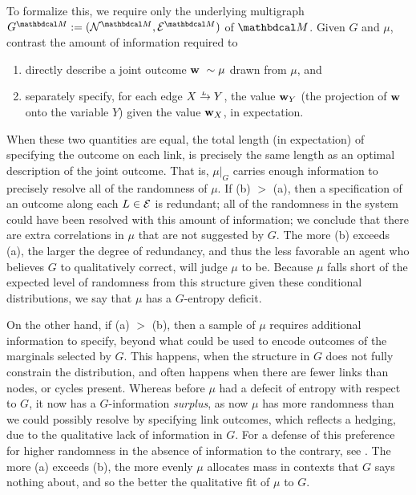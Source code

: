 \documentclass{article}
\begin{document}
	To formalize this, we require only the underlying multigraph $G^{\dg M} :=
	(\N^{\dg M}, \Ed^{\dg M})$ of $\dg M$. 
	Given $G$ and $\mu$, contrast the amount of
	information required to 
	\begin{enumerate}[label=(\alph*)]
		\item directly describe a joint outcome  $\mathbf w ~ \sim \mu$
		drawn from $\mu$, and 
		\item separately specify, for each edge $\ed LXY$, the value
		$\mathbf w_Y$ (the projection of $\mathbf w$ onto the variable
		$Y$) given the value $\mathbf w_X$, in expectation. 
	\end{enumerate}
	When these two quantities are equal, the total length (in expectation) of specifying the outcome on each link, is precisely the same length as an optimal description of the joint outcome. That is, $\mu|_G$ carries enough information to precisely resolve all of the randomness of $\mu$. If (b) $>$ (a), then a specification of an outcome along each $L \in \mathcal E$ is redundant; all of the randomness in the system could have been resolved with this amount of information; we conclude that there are extra correlations in $\mu$ that are not suggested by $G$. The more (b) exceeds (a), the larger the degree of redundancy, and thus the less favorable an agent who believes $G$ to qualitatively correct, will judge $\mu$ to be. Because $\mu$ falls short of the expected level of randomness from this structure given these conditional distributions, we say that $\mu$ has a $G$-entropy deficit.

	On the other hand, if (a) $>$ (b), then a sample of $\mu$ requires additional information to specify, beyond what could be used to encode outcomes of the marginals selected by $G$. This happens, when the structure in $G$ does not fully constrain the distribution, and often happens when there are fewer links than nodes, or cycles present. Whereas before $\mu$ had a defecit of entropy with respect to $G$, it now has a $G$-information \emph{surplus}, as now $\mu$ has more randomness than we could possibly resolve by specifying link outcomes, which reflects a hedging, due to the qualitative lack of information in $G$. For a defense of this preference for higher randomness in the absence of information to the contrary, see \cite{maxent}\cite{adversarial_protection}. The more (a) exceeds (b), the more evenly $\mu$ allocates mass in contexts that $G$ says nothing about, and so the better the qualitative fit of $\mu$ to $G$.
\end{document}
